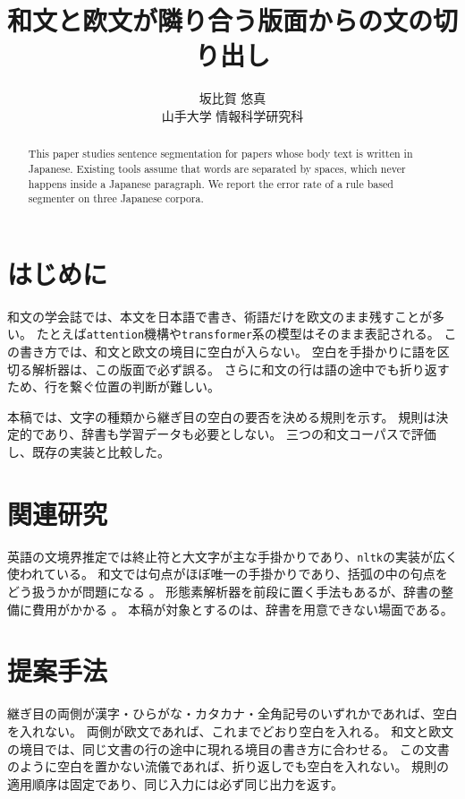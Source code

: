 \documentclass[10pt,a4paper,twocolumn]{article}
\title{和文と欧文が隣り合う版面からの文の切り出し}
\author{坂比賀 悠真\\ 山手大学 情報科学研究科}
\date{}
\newcommand{\s}[1]{#1}
\begin{document}
\maketitle

\begin{abstract}
\s{This paper studies sentence segmentation for papers whose body text is written in Japanese.}
\s{Existing tools assume that words are separated by spaces, which never happens inside a Japanese paragraph.}
\s{We report the error rate of a rule based segmenter on three Japanese corpora.}%
\end{abstract}

\section{はじめに}

\s{和文の学会誌では、本文を日本語で書き、術語だけを欧文のまま残すことが多い。}%
\s{たとえば\texttt{attention}機構や\texttt{transformer}系の模型はそのまま表記される。}%
\s{この書き方では、和文と欧文の境目に空白が入らない。}%
\s{空白を手掛かりに語を区切る解析器は、この版面で必ず誤る。}%
\s{さらに和文の行は語の途中でも折り返すため、行を繋ぐ位置の判断が難しい。}%

\s{本稿では、文字の種類から継ぎ目の空白の要否を決める規則を示す。}%
\s{規則は決定的であり、辞書も学習データも必要としない。}%
\s{三つの和文コーパスで評価し、既存の実装と比較した。}%

\section{関連研究}

\s{英語の文境界推定では終止符と大文字が主な手掛かりであり、\texttt{nltk}の実装が広く使われている。}%
\s{和文では句点がほぼ唯一の手掛かりであり、括弧の中の句点をどう扱うかが問題になる \cite{sato2021}。}%
\s{形態素解析器を前段に置く手法もあるが、辞書の整備に費用がかかる \cite{tanaka2019}。}%
\s{本稿が対象とするのは、辞書を用意できない場面である。}%

\section{提案手法}

\s{継ぎ目の両側が漢字・ひらがな・カタカナ・全角記号のいずれかであれば、空白を入れない。}%
\s{両側が欧文であれば、これまでどおり空白を入れる。}%
\s{和文と欧文の境目では、同じ文書の行の途中に現れる境目の書き方に合わせる。}%
\s{この文書のように空白を置かない流儀であれば、折り返しでも空白を入れない。}%
\s{規則の適用順序は固定であり、同じ入力には必ず同じ出力を返す。}%
\end{document}

